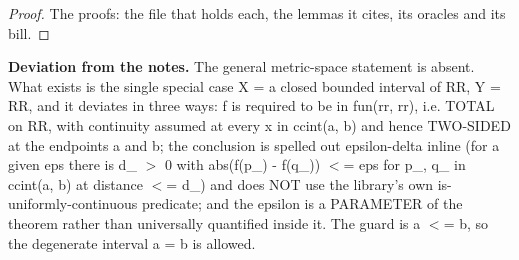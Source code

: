 \begin{prop}\label{thm:continuous-uniformly-continuous-on-ccint}
%
%
\end{prop}
%
\begin{proof}
%
The proofs: the file that holds each, the lemmas it cites, its oracles and its bill.
%
%
%
%
\end{proof}
%
\noindent\textbf{Deviation from the notes.} The general metric-space statement is absent. What exists is the single special case X = a closed bounded interval of RR, Y = RR, and it deviates in three ways: f is required to be in fun(rr, rr), i.e. TOTAL on RR, with continuity assumed at every x in ccint(a, b) and hence TWO-SIDED at the endpoints a and b; the conclusion is spelled out epsilon-delta inline (for a given eps there is d\_ $>$ 0 with abs(f(p\_) - f(q\_)) $<$= eps for p\_, q\_ in ccint(a, b) at distance $<$= d\_) and does NOT use the library's own is-uniformly-continuous predicate; and the epsilon is a PARAMETER of the theorem rather than universally quantified inside it. The guard is a $<$= b, so the degenerate interval a = b is allowed.
